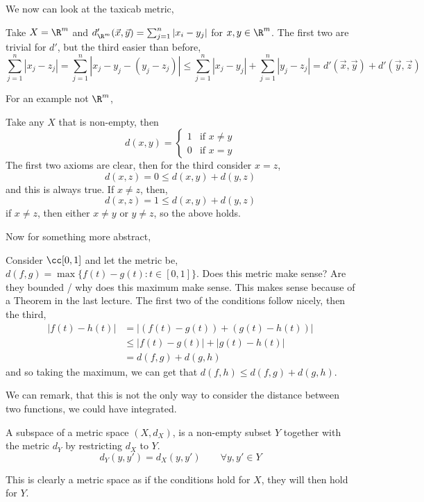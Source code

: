 We now can look at the taxicab metric,
\begin{eg}
  Take $X = \R^m$ and $d'_{\R^m}(\vec x, \vec y) = \sum_{j=1}^n |x_{i} - y_j|$ for $x, y \in \R^m$. The first two are trivial for $d'$, but the third easier than before,
  $$ \sum_{j=1}^n |x_j - z_j| = \sum_{j=1}^n |x_j - y_j - (y_j - z_j)| \le \sum_{j=1}^n |x_j - y_j| + \sum_{j=1}^n |y_j - z_j| = d'(\vec x, \vec y) + d'(\vec y, \vec z)$$
\end{eg}
For an example not $\R^m$,
\begin{eg}
  Take any $X$ that is non-empty, then
  $$ d(x, y) = \begin{cases}
    1 & \text{if $x \ne y$}\\
    0 & \text{if $x = y$}
  \end{cases} $$
  The first two axioms are clear, then for the third consider $x = z$,
  $$ d(x, z) = 0 \le d(x, y) + d(y, z) $$
  and this is always true. If $x \ne z$, then,
  $$ d(x, z) = 1 \le d(x, y) + d(y, z) $$
  if $x \ne z$, then either $x \ne y$ or $y \ne z$, so the above holds.
\end{eg}

Now for something more abstract,
\begin{eg}
  Consider $\cc[0, 1]$ and let the metric be, $d(f, g) = \max\{f(t) - g(t) : t \in [0,1] \}$. Does this metric make sense? Are they bounded / why does this maximum make sense. This makes sense because of a Theorem in the last lecture. The first two of the conditions follow nicely, then the third,
  \begin{align*}
    |f(t) - h(t)| &= |(f(t) - g(t)) + (g(t) - h(t))|\\
    &\le |f(t) - g(t)| + |g(t) - h(t)|\\
    &= d(f, g) + d(g, h)
  \end{align*}
  and so taking the maximum, we can get that $d(f, h) \le d(f, g) + d(g, h)$.
\end{eg}

We can remark, that this is not the only way to consider the distance between two functions, we could have integrated.

\begin{ndefi}[Subspace]
  A subspace of a metric space $(X, d_X)$, is a non-empty subset $Y$ together with the metric $d_Y$ by restricting $d_X$ to $Y$.
  $$ d_Y(y, y') = d_X(y, y') \qquad \forall y, y' \in Y $$
\end{ndefi}
This is clearly a metric space as if the conditions hold for $X$, they will then hold for $Y$.


